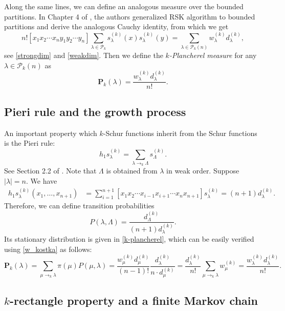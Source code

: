 \documentclass[11pt]{amsart}
\begin{document}
Along the same lines, we can define an analogous measure over the bounded partitions. In Chapter 4 of \cite{L10}, the authors generalized RSK algorithm to bounded partitions and derive the analogous Cauchy identity, from which we get
\[n![x_1 x_2 \cdots x_n y_1 y_2 \cdots y_n]\sum_{\lambda \in \mathcal{P}_k}s_{\lambda}^{(k)}(x)s_{\lambda}^{(k)}(y)= \sum_{\lambda \in \mathcal{P}_k(n)} w_{\lambda}^{(k)} d_{\lambda}^{(k)},\]
see \eqref{strongdim} and \eqref{weakdim}. Then we define the \textit{$k$-Plancherel measure} for any $\lambda \in \mathcal{P}_k(n)$ as
\begin{equation}\label{k-plancherel}
 \mathbf{P}_k(\lambda)=\frac{w_{\lambda}^{(k)}d_{\lambda}^{(k)}}{n!}.  
\end{equation}

\subsection{Pieri rule and the growth process} \label{sec:pieri}

An important property which $k$-Schur functions inherit from the Schur functions is the Pieri rule:
\[h_1 s_{\lambda}^{(k)} = \sum_{\lambda \to_k \Lambda} s_{\Lambda}^{(k)}.\]
See Section 2.2 of \cite{LLMSSZ14}. Note that $\Lambda$ is obtained from $\lambda$ in weak order. Suppose $|\lambda|=n.$ We have
\begin{align*}
[x_1\ldots x_{n+1}] \, h_1 s_{\lambda}^{(k)}(x_1,\ldots,x_{n+1}) &= \sum_{i=1}^{n+1} [x_1 x_2 \cdots x_{i-1}x_{i+1}\cdots x_n x_{n+1}] s_{\lambda}^{(k)} = (n+1) d_{\lambda}^{(k)}.
\end{align*}
Therefore, we can define transition probabilities
\begin{equation}\label{inftrans}
    P(\lambda,\Lambda)= \frac{d_{\Lambda}^{(k)}}{(n+1)d_{\lambda}^{(k)}}.
\end{equation}
Its stationary distribution is given in \eqref{k-plancherel}, which can be easily verified using \eqref{w_kostka} as follows:
\[ \mathbf{P}_k(\lambda)=\sum_{\mu \to_k \lambda}\pi(\mu) P(\mu,\lambda)= 
\frac{w_{\mu}^{(k)}d_{\mu}^{(k)}}{(n-1)!} \frac{d_{\lambda}^{(k)}}{n \cdot d_{\mu}^{(k)}} = 
\frac{d_{\lambda}^{(k)}}{n!}  \sum_{\mu \to_k \lambda} w_{\mu}^{(k)} = \frac{w_{\lambda}^{(k)}d_{\lambda}^{(k)}}{n!}.
\]

\subsection{$k$-rectangle property and a finite Markov chain}\label{sec:rectangle}
\end{document}
